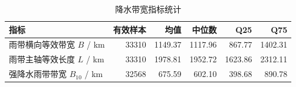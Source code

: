 \begin{table}[htbp]
\centering
\caption{降水带宽指标统计}
\label{tab:rainband_width_stats_problem1}
\begin{tabular}{lrrrrr}
\toprule
指标 & 有效样本 & 均值 & 中位数 & Q25 & Q75 \\
\midrule
雨带横向等效带宽 $B$ / km & 33310 & 1149.37 & 1117.96 & 867.77 & 1402.31 \\
雨带主轴等效长度 $L$ / km & 33310 & 1978.81 & 1952.72 & 1623.86 & 2312.11 \\
强降水雨带带宽 $B_{10}$ / km & 32568 & 675.59 & 602.10 & 398.68 & 890.78 \\
\bottomrule
\end{tabular}
\end{table}
